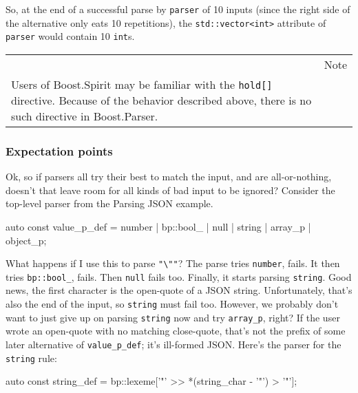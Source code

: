 So, at the end of a successful parse by \texttt{parser} of 10 inputs (since the right side of the alternative only eats 10 repetitions), the \texttt{std::vector<int>} attribute of \texttt{parser} would contain 10 \texttt{int}s.

\begin{longtable}[]{@{}
  >{\raggedright\arraybackslash}p{}
  >{\raggedright\arraybackslash}p{}@{}}
\toprule\noalign{}
\endhead
\bottomrule\noalign{}
\endlastfoot
\begin{minipage}[t]{\linewidth}\raggedright
\end{minipage} & Note \\
Users of Boost.Spirit may be familiar with the \texttt{hold{[}{]}} directive. Because of the behavior described above, there is no such directive in Boost.Parser. & \\
\end{longtable}

\subsubsection{Expectation points}

Ok, so if parsers all try their best to match the input, and are all-or-nothing, doesn't that leave room for all kinds of bad input to be ignored? Consider the top-level parser from the Parsing JSON example.

\begin{code}
auto const value_p_def =
    number | bp::bool_ | null | string | array_p | object_p;
\end{code}

What happens if I use this to parse \texttt{"\textbackslash{}""}? The parse tries \texttt{number}, fails. It then tries \texttt{bp::bool\_}, fails. Then \texttt{null} fails too. Finally, it starts parsing \texttt{string}. Good news, the first character is the open-quote of a JSON string. Unfortunately, that's also the end of the input, so \texttt{string} must fail too. However, we probably don't want to just give up on parsing \texttt{string} now and try \texttt{array\_p}, right? If the user wrote an open-quote with no matching close-quote, that's not the prefix of some later alternative of \texttt{value\_p\_def}; it's ill-formed JSON. Here's the parser for the \texttt{string} rule:

\begin{code}
auto const string_def = bp::lexeme['"' >> *(string_char - '"') > '"'];
\end{code}

